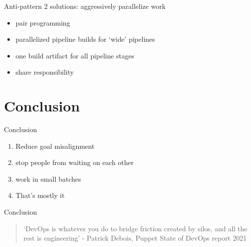 \documentclass{beamer}
\begin{document}
	\begin{frame}{Anti-pattern 2 solutions: aggressively parallelize work}
		\begin{itemize}
			\item pair programming \pause 
			\item parallelized pipeline builds for `wide' pipelines \pause
			\item one build artifact for all pipeline stages \pause
			\item share responsibility
		\end{itemize}
	\end{frame}
	\section{Conclusion}
	\begin{frame}{Conclusion}
		\begin{enumerate}
			\item Reduce goal misalignment \pause
			\item stop people from waiting on each other \pause 
			\item work in small batches \pause
			\item That's mostly it
			
		\end{enumerate}
	\end{frame}
	\begin{frame}{Conclusion}
		\begin{quote}
			`DevOps is whatever you do to bridge friction created by silos, and all the rest is engineering' - Patrick Debois, Puppet State of DevOps report 2021
		\end{quote}
	\end{frame}
	\begin{frame}[plain]
	\titlepage
\end{frame}
\end{document}
